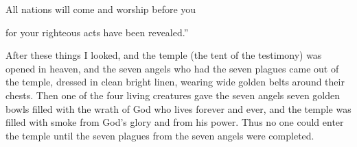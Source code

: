 {\par }{\Q All
nations
will come
and
worship
before
you
\par }{\Q for
your
righteous acts
have been revealed.”
\par }{\PP {}After
these things
I looked,
and
the temple
(the tent
of the testimony) was opened
in
heaven,
and
the seven
angels
who had
the seven
plagues
came out
of
the temple,
dressed in
clean
bright
linen, wearing
wide golden
belts
around
their chests.
Then
one
of
the four
living creatures
gave
the seven
angels
seven
golden
bowls
filled
with the wrath
of God
who lives
forever
and ever,
and
the temple
was filled
with smoke
from
God’s
glory
and
from
his
power.
Thus
no one
could
enter
the temple
until
the seven
plagues
from the seven
angels
were completed.

\par }
